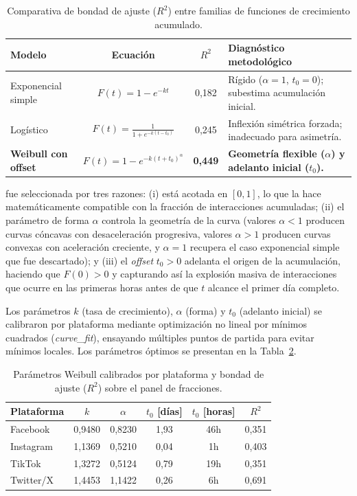 \begin{table}[htbp]
\centering
\small
\caption{Comparativa de bondad de ajuste ($R^2$) entre familias de funciones de crecimiento acumulado.}
\label{tab:comparativa_crecimiento}
\begin{tabular}{l c c p{5.8cm}}
\toprule
\textbf{Modelo} & \textbf{Ecuación} & \textbf{$R^2$} & \textbf{Diagnóstico metodológico} \\
\midrule
Exponencial simple & $F(t) = 1 - e^{-kt}$ & 0{,}182 & Rígido ($\alpha=1$, $t_0=0$); subestima acumulación inicial. \\
Logístico          & $F(t) = \frac{1}{1 + e^{-k(t-t_0)}}$ & 0{,}245 & Inflexión simétrica forzada; inadecuado para asimetría. \\
\textbf{Weibull con offset} & $F(t) = 1 - e^{-k(t+t_0)^\alpha}$ & \textbf{0{,}449} & \textbf{Geometría flexible ($\alpha$) y adelanto inicial ($t_0$).} \\
\bottomrule
\end{tabular}
\end{table}

fue seleccionada por tres razones: (i) está acotada en $[0,1]$, lo que la hace matemáticamente compatible con la fracción de interacciones acumuladas; (ii) el parámetro de forma $\alpha$ controla la geometría de la curva (valores $\alpha < 1$ producen curvas cóncavas con desaceleración progresiva, valores $\alpha > 1$ producen curvas convexas con aceleración creciente, y $\alpha = 1$ recupera el caso exponencial simple que fue descartado); y (iii) el \textit{offset} $t_0 > 0$ adelanta el origen de la acumulación, haciendo que $F(0) > 0$ y capturando así la explosión masiva de interacciones que ocurre en las primeras horas antes de que $t$ alcance el primer día completo.

Los parámetros $k$ (tasa de crecimiento), $\alpha$ (forma) y $t_0$ (adelanto inicial) se calibraron por plataforma mediante optimización no lineal por mínimos cuadrados (\textit{curve\_fit}), ensayando múltiples puntos de partida para evitar mínimos locales. Los parámetros óptimos se presentan en la Tabla~\ref{tab:weibull_params}.

\begin{table}[htbp]
\centering
\caption{Parámetros Weibull calibrados por plataforma y bondad de ajuste ($R^2$) sobre el panel de fracciones.}
\label{tab:weibull_params}
\begin{tabular}{l c c c c c}
\toprule
\textbf{Plataforma} & \textbf{$k$} & \textbf{$\alpha$} & \textbf{$t_0$ [días]} & \textbf{$t_0$ [horas]} & \textbf{$R^2$} \\
\midrule
Facebook    & 0{,}9480 & 0{,}8230 & 1{,}93 & 46h & 0{,}351 \\
Instagram   & 1{,}1369 & 0{,}5210 & 0{,}04 &  1h & 0{,}403 \\
TikTok      & 1{,}3272 & 0{,}5124 & 0{,}79 & 19h & 0{,}351 \\
Twitter/X   & 1{,}4453 & 1{,}1422 & 0{,}26 &  6h & 0{,}691 \\
\bottomrule
\end{tabular}
\end{table}


